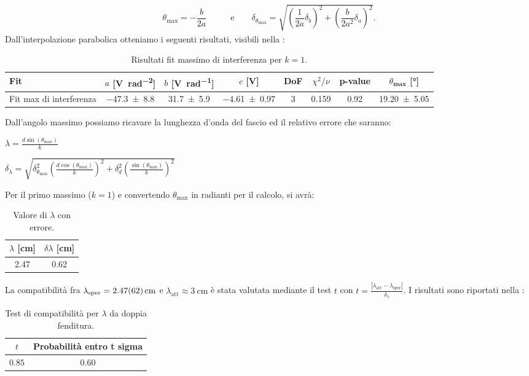 \documentclass[a4paper]{article}
\begin{document}
\begin{align}
  \theta_{\text{max}} = -\dfrac{b}{2a} \qquad & \text{e}\qquad
  \delta_{\theta_{\text{max}}} = \sqrt{\left(\dfrac{1}{2a}\delta_b\right)^2 + \left(\dfrac{b}{2a^2}\delta_a\right)^2}. \label{eq:angolo_max_doppia_fenditura}
\end{align}
Dall'interpolazione parabolica otteniamo i seguenti risultati, visibili nella :
\begin{table}[htbp]
\centering
\caption{Risultati fit massimo di interferenza per $k=1$.}
\label{tab:fit_doppia_fenditura}
\begin{tabular}{|l|ccccccc|}
\hline
Fit & $a$ [\si{\volt\per\radian\squared}]& $b$ [\si{\volt\per\radian}]& $c$ [\si{\volt}]& DoF & $\chi^2/\nu$ & p-value & $\theta_{\textbf{max}}$ [\si{\degree}] \\\hline\hline
Fit max di interferenza & \num{-47.3 \pm 8.8} & \num{31.7 \pm 5.9} & \num{-4.61 \pm 0.97} & 3 & 0.159 & 0.92 & \num{19.20 \pm 5.05}\\\hline
\end{tabular}
\end{table}
Dall'angolo massimo possiamo ricavare la lunghezza d'onda del fascio ed il relativo errore che saranno:
\begin{minipage}{0.45\textwidth}
\centering
$\lambda = \frac{d \sin(\theta_{\text{max}})}{k}$
\end{minipage}
\hfill
\begin{minipage}{0.45\textwidth}
\centering
$\delta_{\lambda} = \sqrt{ \delta_{\theta_{\text{max}}}^2 \left( \frac{d \cos(\theta_{\text{max}})}{k} \right)^2 + \delta_d^2 \left( \frac{\sin(\theta_{\text{max}})}{k} \right)^2 }$
\end{minipage}
\vspace{\baselineskip}

Per il primo massimo ($k=1$) e convertendo $\theta_{\text{max}}$ in radianti per il calcolo, si avrà:
\begin{table}[H]
\centering
\caption{Valore di $\lambda$ con errore.}
\label{tab:valori_di_lambda}
\begin{tabular}{|c|c|}
\hline
$\lambda$ [\si{\centi\metre}] & $\delta\lambda$ [\si{\centi\metre}] \\
\hline
\num{2.47} & \num{0.62} \\
\hline
\end{tabular}
\end{table}
La compatibilità fra $\lambda_{\text{sper}} = \SI{2.47 \pm 0.62}{\centi\metre}$ e $\lambda_{\text{att}} \approx \SI{3}{\centi\metre}$ è stata valutata mediante il test $t$ con $t=\frac{|\lambda_{\text{att}}-\lambda_{\text{sper}}|}{\delta_{\lambda}}$. I risultati sono riportati nella :
\begin{table}[H]
\centering
\caption{Test di compatibilità per $\lambda$ da doppia fenditura.}
\label{tab:test_compatibilita_doppia_fenditura}
\begin{tabular}{|c|c|}
\hline
$t$ & Probabilità entro t sigma \\
\hline
$0.85$ & $0.60$ \\
\hline
\end{tabular}
\end{table}
\end{document}
